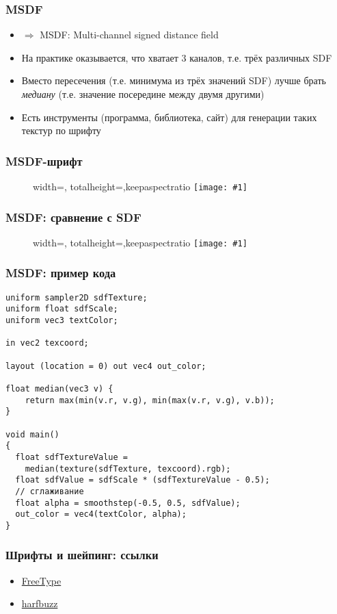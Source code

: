 \documentclass{beamer}
\newcommand{\slideimage}[1]{
  \begin{figure}
    \begin{adjustbox}{width=\textwidth, totalheight=\textheight-2\baselineskip-2\baselineskip,keepaspectratio}
      \texttt{[image: \#1]}
    \end{adjustbox}
  \end{figure}
}
\begin{document}
\begin{frame}[fragile]
\frametitle{MSDF}
\begin{itemize}
\item \begin{math}\Rightarrow\end{math} MSDF: Multi-channel signed distance field
\pause
\item На практике оказывается, что хватает 3 каналов, т.е. трёх различных SDF
\item Вместо пересечения (т.е. минимума из трёх значений SDF) лучше брать \textit{медиану} (т.е. значение посередине между двумя другими)
\pause
\item Есть инструменты (программа, библиотека, сайт) для генерации таких текстур по шрифту
\end{itemize}
\end{frame}

\begin{frame}[fragile]
\frametitle{MSDF-шрифт}
\slideimage{msdf-font.png}
\end{frame}

\begin{frame}[fragile]
\frametitle{MSDF: сравнение с SDF}
\slideimage{msdf.png}
\end{frame}

\begin{frame}[fragile]
\frametitle{MSDF: пример кода}
\fontsize{10pt}{10pt}
\begin{verbatim}
uniform sampler2D sdfTexture;
uniform float sdfScale;
uniform vec3 textColor;

in vec2 texcoord;

layout (location = 0) out vec4 out_color;

float median(vec3 v) {
    return max(min(v.r, v.g), min(max(v.r, v.g), v.b));
}

void main()
{
  float sdfTextureValue =
    median(texture(sdfTexture, texcoord).rgb);
  float sdfValue = sdfScale * (sdfTextureValue - 0.5);
  // сглаживание
  float alpha = smoothstep(-0.5, 0.5, sdfValue);
  out_color = vec4(textColor, alpha);
}
\end{verbatim}
\end{frame}

\begin{frame}[fragile]
\frametitle{Шрифты и шейпинг: ссылки}
\begin{itemize}
\item \href{https://freetype.org}{FreeType}
\item \href{https://harfbuzz.github.io}{harfbuzz}
\end{itemize}
\end{frame}
\end{document}
